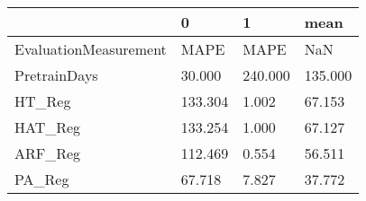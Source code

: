 \begin{tabular}{llll}
\toprule
{} &        0 &        1 &     mean \\
\midrule
EvaluationMeasurement &     MAPE &     MAPE &      NaN \\
PretrainDays          &   30.000 &  240.000 &  135.000 \\
HT\_Reg                &  133.304 &    1.002 &   67.153 \\
HAT\_Reg               &  133.254 &    1.000 &   67.127 \\
ARF\_Reg               &  112.469 &    0.554 &   56.511 \\
PA\_Reg                &   67.718 &    7.827 &   37.772 \\
\bottomrule
\end{tabular}
